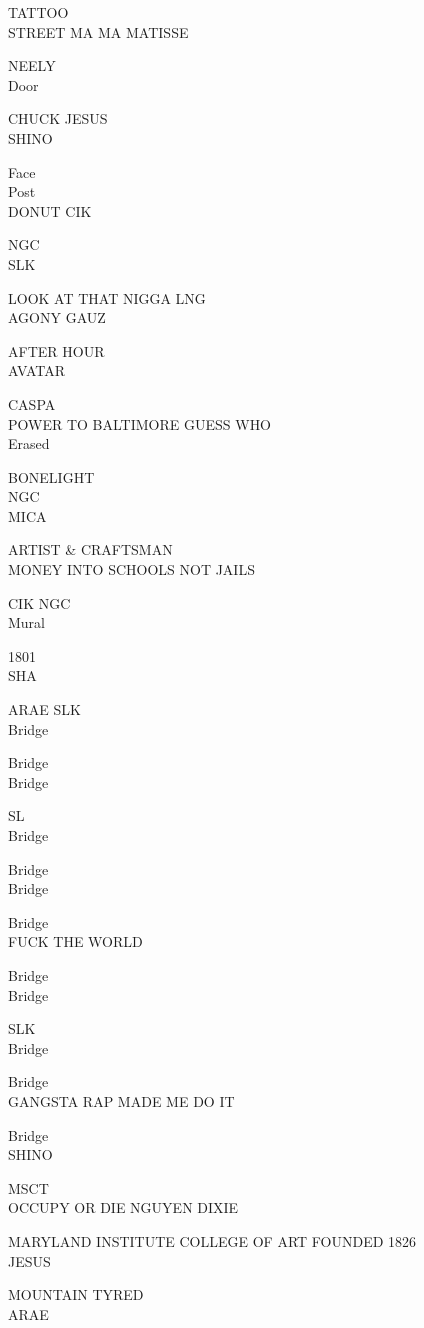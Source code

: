 \documentclass[10pt,letterpaper]{article}
\begin{document}
TATTOO\\
STREET MA MA MATISSE

NEELY\\
Door

CHUCK JESUS\\
SHINO

Face\\
Post\\
DONUT CIK

NGC\\
SLK

LOOK AT THAT NIGGA LNG\\
AGONY GAUZ

AFTER HOUR\\
AVATAR

CASPA\\
POWER TO BALTIMORE GUESS WHO\\
Erased

BONELIGHT\\
NGC\\
MICA

ARTIST \& CRAFTSMAN\\
MONEY INTO SCHOOLS NOT JAILS

CIK NGC\\
Mural

1801\\
SHA

ARAE SLK\\
Bridge

Bridge\\
Bridge

SL\\
Bridge

Bridge\\
Bridge

Bridge\\
FUCK THE WORLD

Bridge\\
Bridge

SLK\\
Bridge

Bridge\\
GANGSTA RAP MADE ME DO IT

Bridge\\
SHINO

MSCT\\
OCCUPY OR DIE NGUYEN DIXIE

MARYLAND INSTITUTE COLLEGE OF ART FOUNDED 1826\\
JESUS

MOUNTAIN TYRED\\
ARAE
\end{document}
